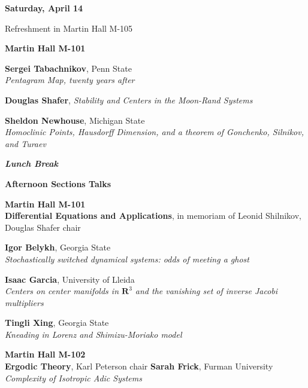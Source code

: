 \documentclass[a4paper,10pt,foldmark,notumble]{leaflet}
\begin{document}
\vspace{0.2cm}
{\large \bf Saturday, April 14}

\hspace{-0.5cm}{\scriptsize 9:00 am - 9:30 am} Refreshment in Martin Hall M-105

{\bf Martin Hall M-101}

\hspace{-0.5cm}{\scriptsize 9:30 am - 10:30 am} {\bf Sergei
Tabachnikov}, Penn State\\ {\it Pentagram Map, twenty years
after}


\hspace{-0.5cm}{\scriptsize 10:45 am - 11:45 am} {\bf Douglas Shafer},
{\it Stability and Centers in the Moon-Rand Systems}


\hspace{-0.5cm}{\scriptsize 12:00 pm - 1:00 pm} {\bf Sheldon Newhouse},
Michigan State\\ {\it Homoclinic Points, Hausdorff Dimension, and a
theorem of Gonchenko, Silnikov, and Turaev}

\hspace{-0.5cm}{\scriptsize 1:00 pm - 2:30 pm}
\textit{\textbf{Lunch Break}}

\begin{center}{\bf Afternoon Sections Talks}
\end{center}

{\bf Martin Hall M-101\\
Differential Equations and Applications}, in memoriam of Leonid
Shilnikov, Douglas Shafer chair

\hspace{-0.5cm}{\scriptsize 2:30 pm - 3:20 pm} {\bf Igor Belykh},
Georgia State\\ {\it Stochastically switched dynamical systems: odds of
meeting a ghost}


\hspace{-0.5cm}{\scriptsize 3:30 pm - 4:15 pm} {\bf Isaac Garcia},
University of Lleida\\ {\it Centers on center manifolds in
$\mathbf{R}^3$ and the vanishing set of inverse Jacobi multipliers}

\hspace{-0.5cm}{\scriptsize 4:30 pm - 5:15 pm} {\bf Tingli Xing},
Georgia State \\ {\it Kneading in Lorenz and
Shimizu-Moriako model}


\vspace{0.5cm}
{\bf Martin Hall M-102\\
Ergodic Theory}, Karl Peterson chair
\hspace{-0.5cm}{\scriptsize 2:30 pm - 3:20 pm} {\bf Sarah Frick}, Furman
University\\{\it Complexity of Isotropic Adic Systems}
\end{document}

